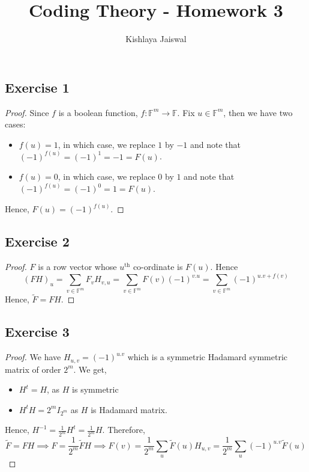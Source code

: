 \documentclass[12pt]{article}
\title{Coding Theory - Homework 3}
\author{Kishlaya Jaiswal}
\begin{document}
\maketitle

\vspace{0.5in}



\subsection*{Exercise 1}

\begin{proof}
Since $f$ is a boolean function, $f: \mathbb{F}^m \to \mathbb{F}$. Fix $u \in \mathbb{F}^m$, then we have two cases:

\begin{itemize}
    \item $f(u) = 1$, in which case, we replace $1$ by $-1$ and note that $(-1)^{f(u)} = (-1)^1 = -1 = F(u)$.
    \item $f(u) = 0$, in which case, we replace $0$ by $1$ and note that $(-1)^{f(u)} = (-1)^0 = 1 = F(u)$.
\end{itemize}
Hence, $F(u) = (-1)^{f(u)}$.
\end{proof}

\subsection*{Exercise 2}
\begin{proof}
$F$ is a row vector whose $u^{\text{th}}$ co-ordinate is $F(u)$. Hence $$(FH)_u = \sum_{v \in \mathbb{F}^m} F_v H_{v,u} = \sum_{v \in \mathbb{F}^m} F(v)(-1)^{v.u} = \sum_{v \in \mathbb{F}^m} (-1)^{u.v + f(v)}$$
Hence, $\tilde{F} = FH$.
\end{proof}

\subsection*{Exercise 3}
\begin{proof}
We have $H_{u,v} = (-1)^{u.v}$ which is a symmetric Hadamard symmetric matrix of order $2^m$. We get,
\begin{itemize}
    \item $H^t = H$, as $H$ is symmetric
    \item $H^t H = 2^m I_{2^m}$ as $H$ is Hadamard matrix.
\end{itemize}
Hence, $H^{-1} = \frac{1}{2^m} H^t = \frac{1}{2^m} H$. Therefore,
$$\tilde{F} = FH \implies F = \frac{1}{2^m}\tilde{F}H \implies F(v) = \frac{1}{2^m} \sum_u \tilde{F}(u) H_{u,v} = \frac{1}{2^m} \sum_u (-1)^{u.v}\tilde{F}(u)$$
\end{proof}
\end{document}
